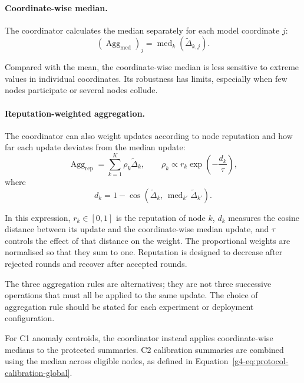 \paragraph{Coordinate-wise median.}

The coordinator calculates the median separately for each model
coordinate $j$:
\begin{equation}
\left(\operatorname{Agg}_{\mathrm{med}}\right)_j
=
\operatorname{med}_{k}
\left(\widetilde{\Delta}_{k,j}\right).
\label{g4-eq:protocol-coordinate-median}
\end{equation}

Compared with the mean, the coordinate-wise median is less sensitive
to extreme values in individual coordinates. Its robustness has
limits, especially when few nodes participate or several nodes
collude.

\paragraph{Reputation-weighted aggregation.}

The coordinator can also weight updates according to node reputation
and how far each update deviates from the median update:
\begin{equation}
\operatorname{Agg}_{\mathrm{rep}}
=
\sum_{k=1}^{K}\rho_k\widetilde{\Delta}_k,
\qquad
\rho_k\propto r_k\exp\!\left(-\frac{d_k}{\tau}\right),
\label{g4-eq:protocol-reputation-aggregation}
\end{equation}
where
\begin{equation}
d_k =
1-\cos\!\left(
\widetilde{\Delta}_k,\,
\operatorname{med}_{k'}
\widetilde{\Delta}_{k'}
\right).
\label{g4-eq:protocol-update-distance}
\end{equation}

In this expression, $r_k\in[0,1]$ is the reputation of node $k$,
$d_k$ measures the cosine distance between its update and the
coordinate-wise median update, and $\tau$ controls the effect of
that distance on the weight. The proportional weights are normalised
so that they sum to one. Reputation is designed to decrease after
rejected rounds and recover after accepted rounds.

The three aggregation rules are alternatives; they are not three
successive operations that must all be applied to the same update.
The choice of aggregation rule should be stated for each experiment
or deployment configuration.

For C1 anomaly centroids, the coordinator instead applies
coordinate-wise medians to the protected summaries. C2 calibration
summaries are combined using the median across eligible nodes, as
defined in Equation~\ref{g4-eq:protocol-calibration-global}.

